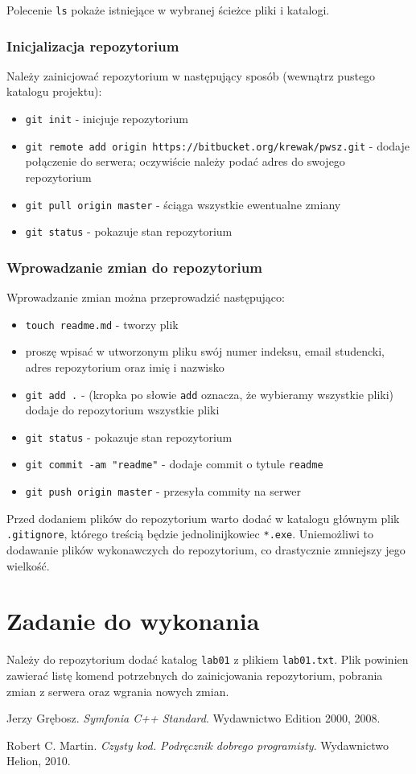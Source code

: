 \documentclass{article}
\begin{document}
	Polecenie \texttt{ls} pokaże istniejące w wybranej ścieżce pliki i katalogi.
	
	\subsubsection{Inicjalizacja repozytorium}
	Należy zainicjować repozytorium w następujący sposób (wewnątrz pustego katalogu projektu):
	\begin{itemize}
		\item \texttt{git init} - inicjuje repozytorium
		\item \texttt{git remote add origin https://bitbucket.org/krewak/pwsz.git} - dodaje połączenie do serwera; oczywiście należy podać adres do swojego repozytorium
		\item \texttt{git pull origin master} - ściąga wszystkie ewentualne zmiany
		\item \texttt{git status} - pokazuje stan repozytorium
	\end{itemize}
	
	\subsubsection{Wprowadzanie zmian do repozytorium}
	Wprowadzanie zmian można przeprowadzić następująco:
	\begin{itemize}
		\item \texttt{touch readme.md} - tworzy plik
		\item proszę wpisać w utworzonym pliku swój numer indeksu, email studencki, adres repozytorium oraz imię i nazwisko
		\item \texttt{git add .} - (kropka po słowie \texttt{add} oznacza, że wybieramy wszystkie pliki) dodaje do repozytorium wszystkie pliki
		\item \texttt{git status} - pokazuje stan repozytorium
		\item \texttt{git commit -am "readme"} - dodaje commit o tytule \texttt{readme}
		\item \texttt{git push origin master} - przesyła commity na serwer
	\end{itemize}

	Przed dodaniem plików do repozytorium warto dodać w katalogu głównym plik \texttt{.gitignore}, którego treścią będzie jednolinijkowiec \texttt{*.exe}. Uniemożliwi to dodawanie plików wykonawczych do repozytorium, co drastycznie zmniejszy jego wielkość.
	
	\section{Zadanie do wykonania}
	Należy do repozytorium dodać katalog \texttt{lab01} z plikiem \texttt{lab01.txt}. Plik powinien zawierać listę komend potrzebnych do zainicjowania repozytorium, pobrania zmian z serwera oraz wgrania nowych zmian.

\begin{thebibliography}{9}
	Jerzy Grębosz.
	\textit{Symfonia C++ Standard}. 
	Wydawnictwo Edition 2000, 2008.
	
	Robert C. Martin.
	\textit{Czysty kod. Podręcznik dobrego programisty}. 
	Wydawnictwo Helion, 2010.
\end{thebibliography}
\end{document}
